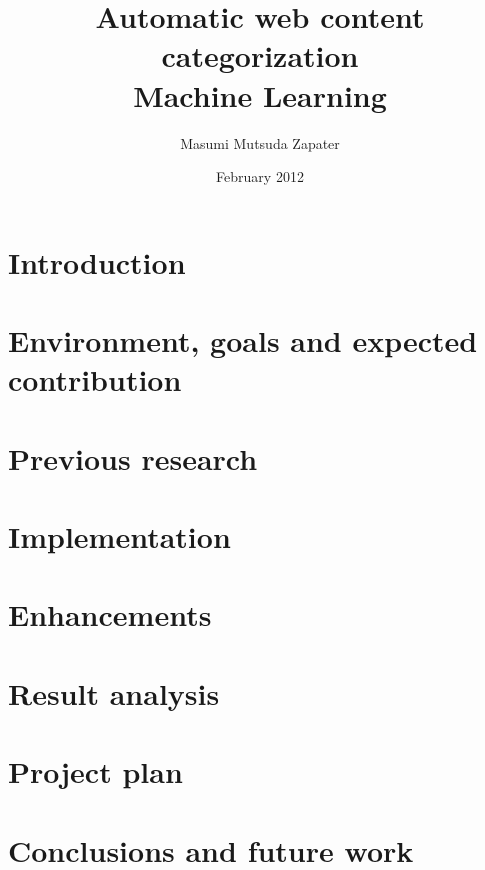 \documentclass[12pt, a4paper , titlepage]{report}
\author{Masumi Mutsuda Zapater}
\title{Automatic web content categorization \\ Machine Learning}
\date{February 2012}
\begin{document}
\maketitle



\tableofcontents


\chapter{Introduction}


\chapter[Env. goals and contrib.]{Environment, goals and expected contribution}
\label{chap:flowsight}


\chapter{Previous research}
\label{chap:research}


\chapter{Implementation}
\label{chap:implementation}


\chapter{Enhancements}
\label{chap:enhancements}


\chapter{Result analysis}
\label{chap:results}


\chapter{Project plan}
\label{chap:plan}



\chapter{Conclusions and future work}
\label{chap:conclusions}



\end{document}
